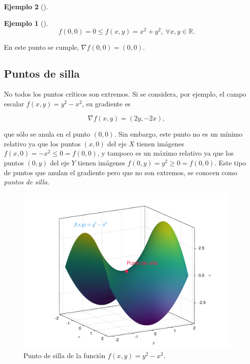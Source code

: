 \documentclass[
  a4paper,
]{scrreport}
\theoremstyle{definition}
\newtheorem{example}{Ejemplo}[chapter]
\theoremstyle{plain}
\theoremstyle{definition}
\theoremstyle{definition}
\theoremstyle{plain}
\theoremstyle{plain}
\theoremstyle{remark}
\begin{document}
\begin{example}[]
\begin{example}[]
\[
f(0,0)=0 \leq f(x,y)=x^2+y^2,\ \forall x,y\in \mathbb{R}.
\]

En este punto se cumple, \(\nabla f(0,0) = (0,0)\).

\end{example}

\subsection{Puntos de silla}\label{puntos-de-silla}

No todos los puntos críticos son extremos. Si se considera, por ejemplo,
el campo escalar \(f(x,y)=y^2-x^2\), su gradiente es

\[\nabla f(x,y) = (2y,-2x),\]

que sólo se anula en el punto \((0,0)\). Sin embargo, este punto no es
un mínimo relativo ya que los puntos \((x,0)\) del eje \(X\) tienen
imágenes \(f(x,0) = -x^2 \leq 0 = f(0,0)\), y tampoco es un máximo
relativo ya que los puntos \((0,y)\) del eje \(Y\) tienen imágenes
\(f(0,y)= y^2 \geq 0 = f(0,0)\). Este tipo de puntos que anulan el
gradiente pero que no son extremos, se conocen como \emph{puntos de
silla}.

\begin{figure}[H]

{\centering \includegraphics{img/derivadas-funciones-varias-variables/punto-silla.pdf}

}

\caption{Punto de silla de la función \(f(x,y)=y^2-x^2\).}

\end{figure}%


\end{example}
\end{document}

